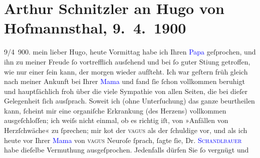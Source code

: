 

               \section[Arthur Schnitzler an Hugo von Hofmannsthal, 9. 4. 1900]{ Arthur Schnitzler an Hugo von Hofmannsthal, 9. 4. 1900}\nopagebreak{}\rehead{ }\normalsize\beginnumbering{} \toendnotes[C]{\smallbreak\pagebreak[2]} 
\toendnotes[C]{\smallbreak}\pstart
           \raggedleft{}{\pb}9/4 900. \pend
           \pstart
           mein lieber Hugo, heute Vormittag habe ich Ihren \textcolor{blue}{Papa}{} geſprochen, und ihn zu meiner Freude ſo
               vortrefflich ausſehend und bei ſo guter Sti{\geminationm}ung
               getroffen, wie nur einer ſein kann, der morgen wieder aufſteht. Ich war geſtern
                  früh gleich nach meiner Ankunft bei Ihrer \textcolor{blue}{Mama}{} und fand ſie ſchon vollkommen beruhigt
               und hauptſächlich froh über die viele Sympathie von allen Seiten, die bei dieſer
               Gelegenheit ſich ausſprach. {\pb}Soweit ich (ohne
               Unterſuchung) das ganze beurtheilen kann, ſcheint mir eine organiſche Erkrankung \introOben{}(des Herzens)\introOben{} vollkommen ausgeſchloſſen; ich weiſs nicht
               einmal, ob es richtig iſt, von »Anfällen von Herzſchwäche« zu ſprechen; mir ko{\geminationm}t der \textsc{vagus} als der ſchuldige
               vor, und als ich heute vor Ihrer \textcolor{blue}{Mama}{} von \textsc{vagus} Neuroſe ſprach, ſagte ſie, Dr. \textcolor{blue}{\textsc{Schandlbauer}}{}\ledrightnote{\textcolor{blue}{Hans Schandlbauer}} habe dieſelbe Vermuthung ausgeſprochen. Jedenfalls dürfen Sie ſo vergnügt und
